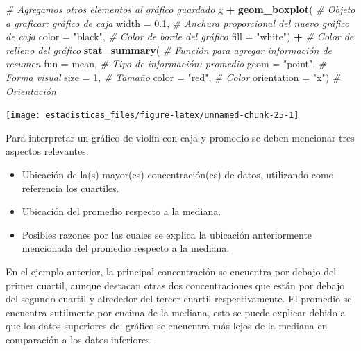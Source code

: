 \documentclass[
  11pt,
]{book}
\newenvironment{Shaded}{\begin{snugshade}}{\end{snugshade}}
\newcommand{\AttributeTok}[1]{\textcolor[rgb]{0.13,0.29,0.53}{#1}}
\newcommand{\CommentTok}[1]{\textcolor[rgb]{0.56,0.35,0.01}{\textit{#1}}}
\newcommand{\DecValTok}[1]{\textcolor[rgb]{0.00,0.00,0.81}{#1}}
\newcommand{\FloatTok}[1]{\textcolor[rgb]{0.00,0.00,0.81}{#1}}
\newcommand{\FunctionTok}[1]{\textcolor[rgb]{0.13,0.29,0.53}{\textbf{#1}}}
\newcommand{\NormalTok}[1]{#1}
\newcommand{\SpecialCharTok}[1]{\textcolor[rgb]{0.81,0.36,0.00}{\textbf{#1}}}
\newcommand{\StringTok}[1]{\textcolor[rgb]{0.31,0.60,0.02}{#1}}
\providecommand{\tightlist}{%
  \setlength{\itemsep}{0pt}\setlength{\parskip}{0pt}}
\theoremstyle{definition}
\theoremstyle{definition}
\theoremstyle{definition}
\theoremstyle{definition}
\theoremstyle{remark}
\begin{document}
\begin{Shaded}
\begin{Highlighting}[]
\CommentTok{\# Agregamos otros elementos al gráfico guardado}
\NormalTok{g }\SpecialCharTok{+} \FunctionTok{geom\_boxplot}\NormalTok{( }\CommentTok{\# Objeto a graficar: gráfico de caja}
  \AttributeTok{width =} \FloatTok{0.1}\NormalTok{, }\CommentTok{\# Anchura proporcional del nuevo gráfico de caja}
  \AttributeTok{color =} \StringTok{"black"}\NormalTok{, }\CommentTok{\# Color de borde del gráfico}
  \AttributeTok{fill =} \StringTok{"white"}\NormalTok{) }\SpecialCharTok{+} \CommentTok{\# Color de relleno del gráfico}
  \FunctionTok{stat\_summary}\NormalTok{( }\CommentTok{\# Función para agregar información de resumen}
    \AttributeTok{fun =}\NormalTok{ mean, }\CommentTok{\# Tipo de información: promedio}
    \AttributeTok{geom =} \StringTok{"point"}\NormalTok{, }\CommentTok{\# Forma visual}
    \AttributeTok{size =} \DecValTok{1}\NormalTok{, }\CommentTok{\# Tamaño}
    \AttributeTok{color =} \StringTok{"red"}\NormalTok{, }\CommentTok{\# Color}
    \AttributeTok{orientation =} \StringTok{"x"}\NormalTok{) }\CommentTok{\# Orientación}
\end{Highlighting}
\end{Shaded}

\begin{center}\texttt{[image: estadisticas\_files/figure-latex/unnamed-chunk-25-1]} \end{center}

Para interpretar un gráfico de violín con caja y promedio se deben mencionar tres aspectos relevantes:

\begin{itemize}
\tightlist
\item
  Ubicación de la(s) mayor(es) concentración(es) de datos, utilizando como referencia los cuartiles.
\item
  Ubicación del promedio respecto a la mediana.
\item
  Posibles razones por las cuales se explica la ubicación anteriormente mencionada del promedio respecto a la mediana.
\end{itemize}

En el ejemplo anterior, la principal concentración se encuentra por debajo del primer cuartil, aunque destacan otras dos concentraciones que están por debajo del segundo cuartil y alrededor del tercer cuartil respectivamente. El promedio se encuentra sutilmente por encima de la mediana, esto se puede explicar debido a que los datos superiores del gráfico se encuentra más lejos de la mediana en comparación a los datos inferiores.
\end{document}
